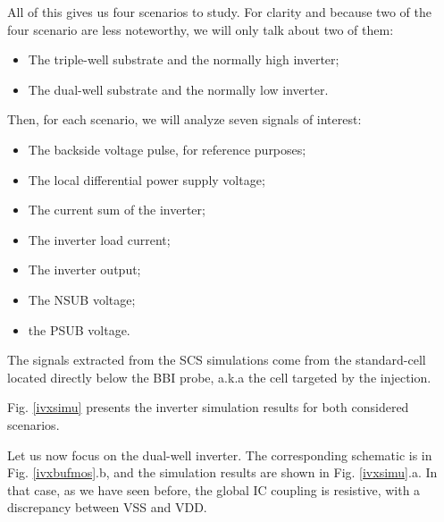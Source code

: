 		All of this gives us four scenarios	 to study.
		For clarity and because two of the four scenario are less noteworthy, we will only talk about two of them:
		\begin{itemize}
			\item The triple-well substrate and the normally high inverter;
			\item The dual-well substrate and the normally low inverter.
		\end{itemize}
		Then, for each scenario, we will analyze seven signals of interest:
		\begin{itemize}
			\item The backside voltage pulse, for reference purposes;
			\item The local differential power supply voltage;
			\item The current sum of the inverter;
			\item The inverter load current;
			\item The inverter output;
			\item The NSUB voltage;
			\item the PSUB voltage.
		\end{itemize}
		The signals extracted from the SCS simulations come from the standard-cell located directly below the BBI probe, a.k.a the cell targeted by the injection.
		
		Fig. \ref{ivxsimu} presents the inverter simulation results for both considered scenarios.
		
		Let us now focus on the dual-well inverter.
		The corresponding schematic is in Fig. \ref{ivxbufmos}.b, and the simulation results are shown in Fig. \ref{ivxsimu}.a.
		In that case, as we have seen before, the global IC coupling is resistive, with a discrepancy between VSS and VDD.


